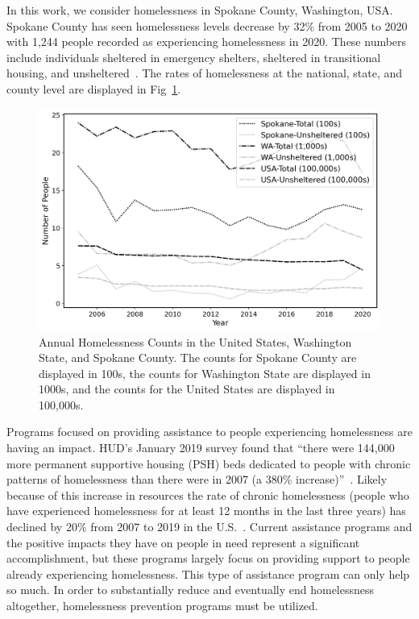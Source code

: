 \documentclass[10pt,letterpaper]{article}
\begin{document}
In this work, we consider homelessness in Spokane County, Washington, USA.  Spokane County has seen  homelessness levels decrease by 32\% from 2005 to 2020 with 1,244 people recorded as experiencing homelessness in 2020. These numbers include individuals sheltered in emergency shelters, sheltered in transitional housing, and unsheltered~\cite{PITcount}. The rates of homelessness at the national, state, and county level are displayed in Fig~\ref{fig:homelessness_counts}.

\begin{figure}[h]
    \includegraphics[width=\textwidth]{homelessness_all.png}
    \caption{Annual Homelessness Counts in the United States, Washington State, and Spokane County. The counts for Spokane County are displayed in 100s, the counts for Washington State are displayed in 1000s, and the counts for the United States are displayed in 100,000s.~\cite{PITcount}}
    \label{fig:homelessness_counts}
\end{figure}

Programs focused on providing assistance to people experiencing homelessness are having an impact. HUD's January 2019 survey found that ``there were 144,000 more permanent supportive housing (PSH) beds dedicated to people with chronic patterns of homelessness than there were in 2007 (a 380\% increase)''~\cite{2019AHAR}. Likely because of this increase in resources the rate of chronic homelessness (people who have experienced homelessness for at least 12 months in the last three years) has declined by 20\% from 2007 to 2019 in the U.S.~\cite{2019AHAR}. Current assistance programs and the positive impacts they have on people in need represent a significant accomplishment, but these programs largely focus on providing support to people already experiencing homelessness. This type of assistance program can only help so much. In order to substantially reduce and eventually end homelessness altogether, homelessness prevention programs must be utilized. 
\end{document}
